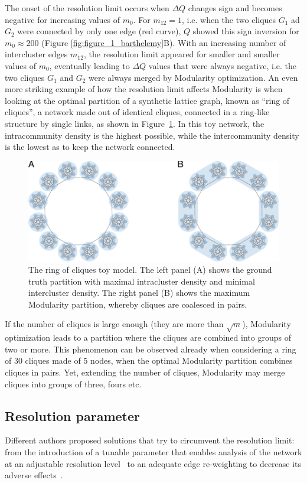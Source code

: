 The onset of the resolution limit occurs when $\Delta Q$ changes sign and becomes negative for increasing values of $m_0$.
For $m_{12}=1$, i.e. when the two cliques $G_1$ ad $G_2$ were connected by only one edge (red curve), $Q$ showed this sign inversion for $m_0 \approx 200$ (Figure \ref{fig:figure_1_barthelemy}B).
With an increasing number of intercluster edges $m_{12}$, the resolution limit appeared for smaller and smaller values of $m_0$, eventually leading to $\Delta Q$ values that were always negative, i.e. the two cliques $G_1$ and $G_2$ were always merged by Modularity optimization.
An even more striking example of how the resolution limit affects Modularity is when looking at the optimal partition of a synthetic lattice graph, known as ``ring of cliques'', a network made out of identical cliques, connected in a ring-like structure by single links, as shown in Figure~\ref{fig:traag_ring_of_cliques}. In this toy network, the intracommunity density is the highest possible, while the intercommunity density is the lowest as to keep the network connected.
\begin{figure}[htb!]
\centering
\includegraphics[width=1\textwidth]{images/traag_ring_of_cliques.pdf}
\caption{The ring of cliques toy model. The left panel (A) shows the ground truth partition with maximal intracluster density and minimal intercluster density. The right panel (B) shows the maximum Modularity partition, whereby cliques are coalesced in pairs.}
\label{fig:traag_ring_of_cliques}
\end{figure}
If the number of cliques is large enough (they are more than $\sqrt{m}$), Modularity optimization leads to a partition where the cliques are combined into groups of two or more. This phenomenon can be observed already when considering a ring of 30 cliques made of 5 nodes, when the optimal Modularity partition combines cliques in pairs.
Yet, extending the number of cliques, Modularity may merge cliques into groups of three, fours etc.

\subsection{Resolution parameter}\label{sec:resolution_parameter}
Different authors proposed solutions that try to circumvent the resolution limit: from the introduction of a tunable parameter that enables analysis of the network at an adjustable resolution level~\cite{reichardt2006,ronhovde2010,yeo2011} to an adequate edge re-weighting to decrease its adverse effects~\cite{berry2011}.

